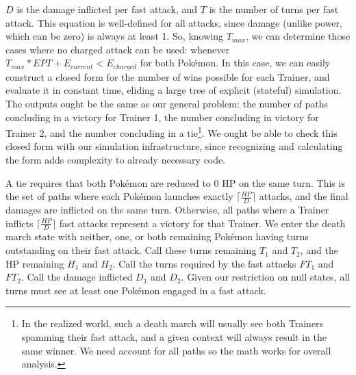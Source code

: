 $D$ is the damage inflicted per fast attack, and $T$ is the number of turns per fast attack.
This equation is well-defined for all attacks, since damage (unlike power,
  which can be zero) is always at least 1.
So, knowing $T_{max}$, we can determine those cases where no charged attack
  can be used: whenever $T_{max} * EPT + E_{current} < E_{charged}$ for both Pokémon.
In this case, we can easily construct a closed form for the number of wins
  possible for each Trainer, and evaluate it in constant time, eliding
  a large tree of explicit (stateful) simulation.
The outputs ought be the same as our general problem: the number of paths
  concluding in a victory for Trainer 1, the number concluding in victory for
  Trainer 2, and the number concluding in a tie\footnote{In the realized world,
  such a death march will usually see both Trainers spamming their fast attack,
  and a given context will always result in the same winner. We need account
  for all paths so the math works for overall analysis.}.
We ought be able to check this closed form with our simulation infrastructure,
  since recognizing and calculating the form adds complexity to
  already necessary code.

A tie requires that both Pokémon are reduced to 0 HP on the same turn.
This is the set of paths where each Pokémon launches exactly $\lceil\frac{HP}{D}\rceil$
  attacks, and the final damages are inflicted on the same turn.
Otherwise, all paths where a Trainer inflicts $\lceil\frac{HP}{D}\rceil$ fast attacks
  represent a victory for that Trainer.
We enter the death march state with neither, one, or both remaining Pokémon having
  turns outstanding on their fast attack.
Call these turns remaining $T_1$ and $T_2$, and the HP remaining $H_1$ and $H_2$.
Call the turns required by the fast attacks $FT_1$ and $FT_2$.
Call the damage inflicted $D_1$ and $D_2$.
Given our restriction on null states, all turns must see at least one Pokémon engaged
  in a fast attack.

